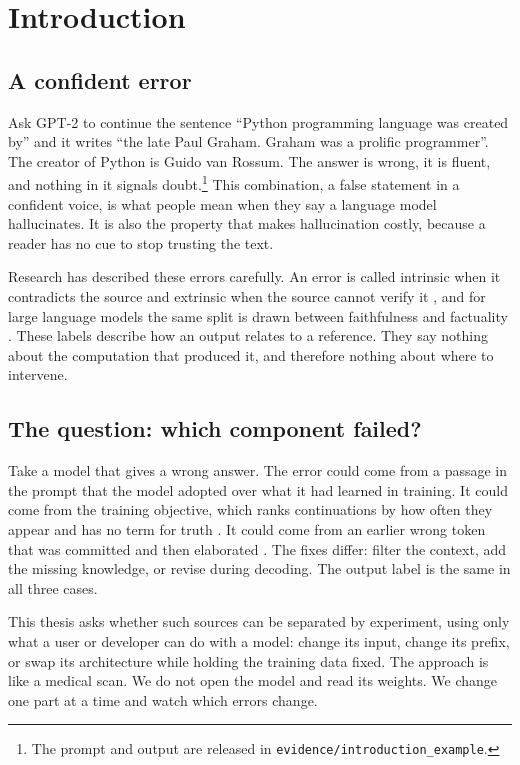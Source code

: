 \documentclass[11pt,a4paper,oneside]{report}
\begin{document}
\clearpage
{}

\chapter{Introduction}

\section{A confident error}
Ask GPT-2 to continue the sentence ``Python programming language was created by'' and it writes ``the late Paul Graham. Graham was a prolific programmer''. The creator of Python is Guido van Rossum. The answer is wrong, it is fluent, and nothing in it signals doubt.\footnote{The prompt and output are released in \texttt{evidence/introduction\_example}.} This combination, a false statement in a confident voice, is what people mean when they say a language model hallucinates. It is also the property that makes hallucination costly, because a reader has no cue to stop trusting the text.

Research has described these errors carefully. An error is called intrinsic when it contradicts the source and extrinsic when the source cannot verify it \citep{maynez2020,ji2023}, and for large language models the same split is drawn between faithfulness and factuality \citep{huang2025}. These labels describe how an output relates to a reference. They say nothing about the computation that produced it, and therefore nothing about where to intervene.

\section{The question: which component failed?}
Take a model that gives a wrong answer. The error could come from a passage in the prompt that the model adopted over what it had learned in training. It could come from the training objective, which ranks continuations by how often they appear and has no term for truth \citep{lin2022,kalai2025}. It could come from an earlier wrong token that was committed and then elaborated \citep{zhang2024snowball}. The fixes differ: filter the context, add the missing knowledge, or revise during decoding. The output label is the same in all three cases.

This thesis asks whether such sources can be separated by experiment, using only what a user or developer can do with a model: change its input, change its prefix, or swap its architecture while holding the training data fixed. The approach is like a medical scan. We do not open the model and read its weights. We change one part at a time and watch which errors change.
\end{document}

